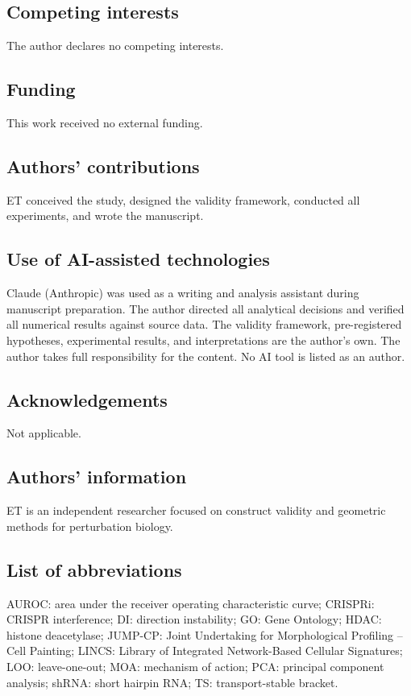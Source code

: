 \documentclass[11pt]{article}
\begin{document}
\subsection*{Competing interests}
The author declares no competing interests.

\subsection*{Funding}
This work received no external funding.

\subsection*{Authors' contributions}
ET conceived the study, designed the validity framework, conducted
all experiments, and wrote the manuscript.

\subsection*{Use of AI-assisted technologies}
Claude (Anthropic) was used as a writing and analysis assistant during
manuscript preparation. The author directed all analytical decisions and
verified all numerical results against source data. The validity framework,
pre-registered hypotheses, experimental results, and interpretations are
the author's own. The author takes full responsibility for the content.
No AI tool is listed as an author.

\subsection*{Acknowledgements}
Not applicable.

\subsection*{Authors' information}
ET is an independent researcher focused on construct validity
and geometric methods for perturbation biology.

\subsection*{List of abbreviations}
AUROC: area under the receiver operating characteristic curve;
CRISPRi: CRISPR interference;
DI: direction instability;
GO: Gene Ontology;
HDAC: histone deacetylase;
JUMP-CP: Joint Undertaking for Morphological Profiling -- Cell Painting;
LINCS: Library of Integrated Network-Based Cellular Signatures;
LOO: leave-one-out;
MOA: mechanism of action;
PCA: principal component analysis;
shRNA: short hairpin RNA;
TS: transport-stable bracket.
\end{document}

